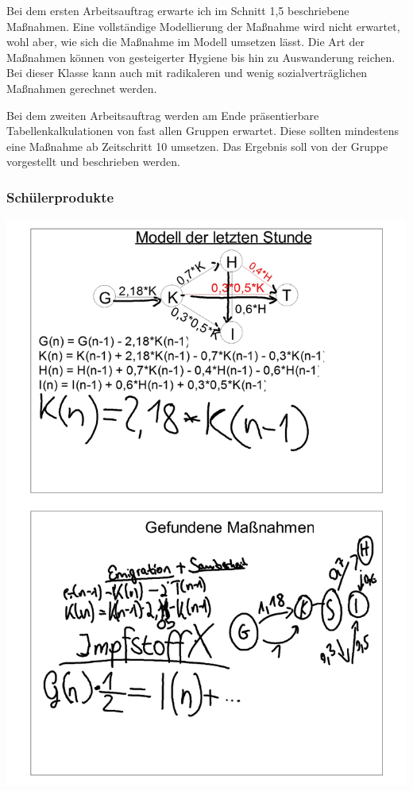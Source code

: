 Bei dem ersten Arbeitsauftrag erwarte ich im Schnitt 1,5 beschriebene Maßnahmen. Eine vollständige Modellierung der Maßnahme wird nicht erwartet, wohl aber, wie sich die Maßnahme im Modell umsetzen lässt. Die Art der Maßnahmen können von gesteigerter Hygiene bis hin zu Auswanderung reichen. Bei dieser Klasse kann auch mit radikaleren und wenig sozialverträglichen Maßnahmen gerechnet werden. 

Bei dem zweiten Arbeitsauftrag werden am Ende präsentierbare Tabellenkalkulationen von fast allen Gruppen erwartet. Diese sollten mindestens eine Maßnahme ab Zeitschritt 10 umsetzen. Das Ergebnis soll von der Gruppe vorgestellt und beschrieben werden.
\subsubsection{Schülerprodukte}
\includegraphics[width=\textwidth]{projekt/leistung_3_1}
